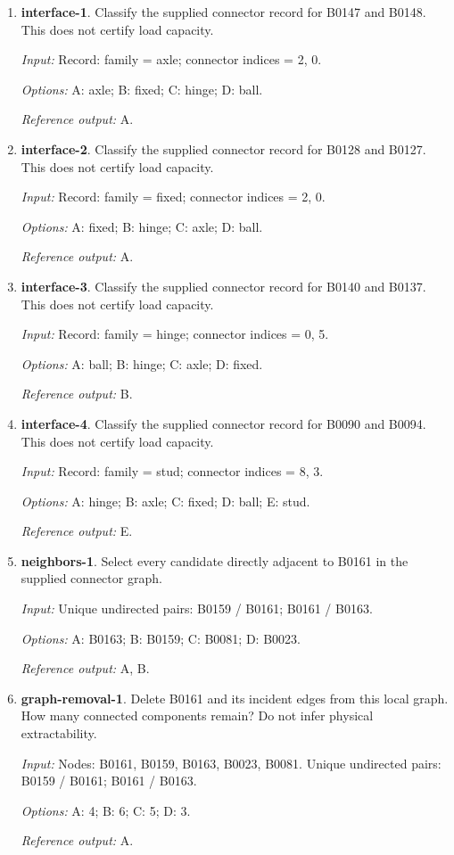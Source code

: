 \begin{enumerate}
\item \textbf{interface-1}. Classify the supplied connector record for B0147 and B0148. This does not certify load capacity.\par {\small \textit{Input:} Record: family = axle; connector indices = 2, 0. \par\textit{Options:} A: axle; B: fixed; C: hinge; D: ball. \par\textit{Reference output:} A.}
\item \textbf{interface-2}. Classify the supplied connector record for B0128 and B0127. This does not certify load capacity.\par {\small \textit{Input:} Record: family = fixed; connector indices = 2, 0. \par\textit{Options:} A: fixed; B: hinge; C: axle; D: ball. \par\textit{Reference output:} A.}
\item \textbf{interface-3}. Classify the supplied connector record for B0140 and B0137. This does not certify load capacity.\par {\small \textit{Input:} Record: family = hinge; connector indices = 0, 5. \par\textit{Options:} A: ball; B: hinge; C: axle; D: fixed. \par\textit{Reference output:} B.}
\item \textbf{interface-4}. Classify the supplied connector record for B0090 and B0094. This does not certify load capacity.\par {\small \textit{Input:} Record: family = stud; connector indices = 8, 3. \par\textit{Options:} A: hinge; B: axle; C: fixed; D: ball; E: stud. \par\textit{Reference output:} E.}
\item \textbf{neighbors-1}. Select every candidate directly adjacent to B0161 in the supplied connector graph.\par {\small \textit{Input:} Unique undirected pairs: B0159 / B0161; B0161 / B0163. \par\textit{Options:} A: B0163; B: B0159; C: B0081; D: B0023. \par\textit{Reference output:} A, B.}
\item \textbf{graph-removal-1}. Delete B0161 and its incident edges from this local graph. How many connected components remain? Do not infer physical extractability.\par {\small \textit{Input:} Nodes: B0161, B0159, B0163, B0023, B0081. Unique undirected pairs: B0159 / B0161; B0161 / B0163. \par\textit{Options:} A: 4; B: 6; C: 5; D: 3. \par\textit{Reference output:} A.}

\end{enumerate}
